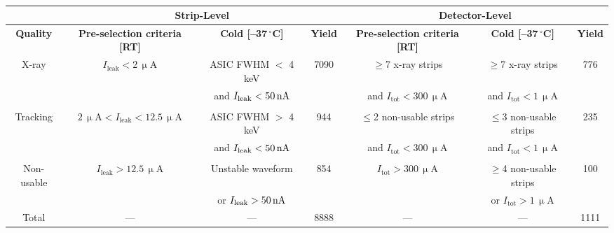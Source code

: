 \begin{table*}[h!]
    \centering
        \caption{}

    \begin{tabular}{c|c|c|c|c|c|c}
    \hline
    \hline
        & \multicolumn{3}{c|}{\textbf{Strip-Level}} & \multicolumn{3}{c}{\textbf{Detector-Level}} \\
        \hline
        \textbf{Quality} & \textbf{Pre-selection criteria [RT]} & \textbf{Cold [--37\,$^{\boldsymbol{\circ}}$C]} & \textbf{Yield} & \textbf{Pre-selection criteria [RT]} & \textbf{Cold [--37\,$^{\boldsymbol{\circ}}$C]} & \textbf{Yield} \\
        \hline
        X-ray & $I_\text{leak} < 2\,\upmu\text{A}$ & ASIC FWHM $<$ 4 keV & 7090 & $\ge$7 x-ray strips & $\ge$7 x-ray strips & 776 \\
         & & and $I_\text{leak} < 50\text{\,nA}$ & & and $I_\text{tot} < 300\,\upmu\text{A}$ & and $I_\text{tot} < 1\,\upmu\text{A}$ & \\
        & & & & & & \\
         Tracking & $2\,\upmu\text{A} < I_\text{leak} < 12.5\,\upmu\text{A}$ & ASIC FWHM $>$ 4 keV & 944 & $\le$2 non-usable strips & $\le$3 non-usable strips & 235 \\
         & & and $I_\text{leak} < 50\text{\,nA}$ & & and $I_\text{tot} < 300\,\upmu\text{A}$& and $I_\text{tot} < 1\,\upmu\text{A}$ & \\
         & & & & & & \\
         Non-usable & $I_\text{leak} > 12.5\,\upmu\text{A}$ & Unstable waveform  & 854 & $I_\text{tot} > 300\,\upmu\text{A}$ & $\ge$4 non-usable strips  & 100 \\
         & & or $I_\text{leak} > 50\text{\,nA}$  & & & or $I_\text{tot} > 1\,\upmu\text{A}$ & \\
         \hline
         Total & --- & --- & 8888 & --- & --- & 1111
    \end{tabular}
    \vspace{0.5cm}
    \label{tab:test_results}
\end{table*}